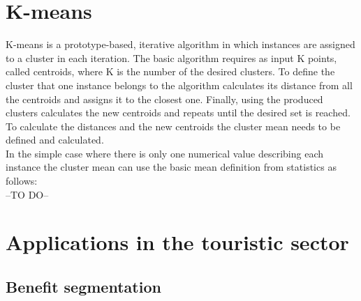 \section{K-means}
K-means is a prototype-based, iterative algorithm in which instances are assigned to a cluster in each iteration. The basic algorithm requires as input K points, called centroids, where K is the number of the desired clusters. To define the cluster that one instance belongs to the algorithm calculates its distance from all the centroids and assigns it to the closest one. Finally, using the produced clusters calculates the new centroids and repeats until the desired set is reached. To calculate the distances and the new centroids the cluster mean needs to be defined and calculated. \autocite{dunham, tanSteinKum} \\
In the simple case where there is only one numerical value describing each instance the cluster mean can use the basic mean definition from statistics as follows: \\
--TO DO--

\section{Applications in the touristic sector}

\subsection{Benefit segmentation}



 